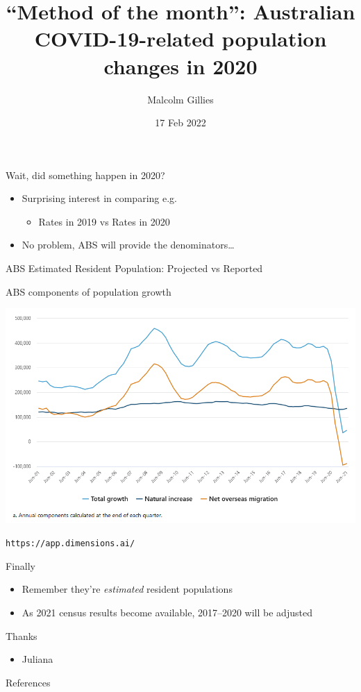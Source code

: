 \documentclass[aspectratio=169,12pt]{beamer} %
\title{``Method of the month'': Australian COVID-19-related population changes in 2020}
\author{Malcolm Gillies}
\date{17 Feb 2022}
\begin{document}
{
\begin{frame}
\titlepage
\end{frame}
}

\begin{frame}{Wait, did something happen in 2020?}
	\begin{itemize}
		\item Surprising interest in comparing e.g.
			\begin{itemize}
				\item Rates in 2019 vs Rates in 2020
			\end{itemize}
		\item No problem, ABS will provide the denominators\dots
	\end{itemize}
\end{frame}

\begin{frame}{ABS Estimated Resident Population: Projected vs Reported}
\end{frame}

\begin{frame}{ABS components of population growth}

	\center\includegraphics[height=0.8\textheight]{ref/pop-components.PNG}
\end{frame}
\begin{frame}[plain,b]
\begin{flushright}\texttt{https://app.dimensions.ai/}\end{flushright}
\end{frame}
\usebackgroundtemplate{}



\begin{frame}{Finally}
	\begin{itemize}
		\item Remember they're \emph{estimated} resident populations
		\item As 2021 census results become available, 2017--2020 will be adjusted
	\end{itemize}
\end{frame}

\begin{frame}{Thanks}
    \begin{itemize}
        \item Juliana
    \end{itemize}
\end{frame}

\begin{frame}{References}
%        
\end{frame}
\end{document}
